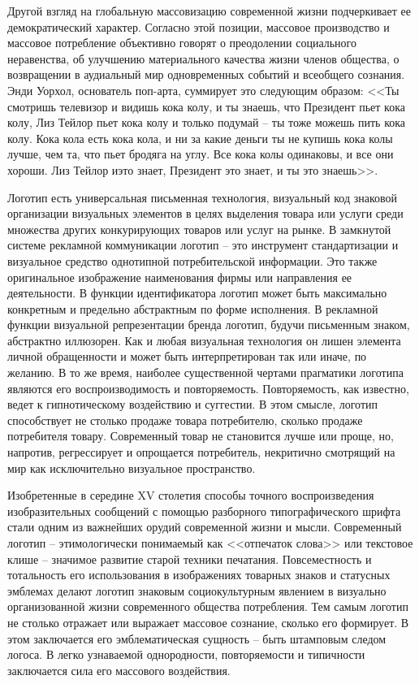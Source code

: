 Другой взгляд на глобальную массовизацию современной жизни подчеркивает ее демократический
характер. Согласно этой позиции, массовое производство и массовое потребление объективно говорят о
преодолении социального неравенства, об улучшению материального качества жизни членов общества, о
возвращении в аудиальный мир одновременных событий и всеобщего сознания. Энди Уорхол, основатель
поп-арта, суммирует это следующим образом: <<Ты смотришь телевизор и видишь кока колу, и ты знаешь,
что Президент пьет кока колу, Лиз Тейлор пьет кока колу и только подумай -- ты тоже можешь пить кока
колу. Кока кола есть кока кола, и ни за какие деньги ты не купишь кока колы лучше, чем та, что пьет
бродяга на углу. Все кока колы одинаковы, и все они хороши. Лиз Тейлор иэто знает, Президент это
знает, и ты это знаешь>>. \autocite[][]{warhol2002}  %

Логотип есть универсальная письменная технология, визуальный код знаковой организации визуальных
элементов в целях выделения товара или услуги среди множества других конкурирующих товаров или услуг
на рынке. В замкнутой системе рекламной коммуникации логотип -- это инструмент стандартизации и
визуальное средство однотипной потребительской информации. Это также оригинальное изображение
наименования фирмы или направления ее деятельности. В функции идентификатора логотип может быть
максимально конкретным и предельно абстрактным по форме исполнения. В рекламной функции визуальной
репрезентации бренда логотип, будучи письменным знаком, абстрактно иллюзорен. Как и любая визуальная
технология он лишен элемента личной обращенности и может быть интерпретирован так или иначе, по
желанию. В то же время, наиболее существенной чертами прагматики логотипа являются его
воспроизводимость и повторяемость. Повторяемость, как известно, ведет к гипнотическому воздействию и
суггестии. В этом смысле, логотип способствует не столько продаже товара потребителю, сколько
продаже потребителя товару. Современный товар не становится лучше или проще, но, напротив,
регрессирует и опрощается потребитель, некритично смотрящий на мир как исключительно визуальное
пространство.

Изобретенные в середине XV столетия способы точного воспроизведения изобразительных сообщений с
помощью разборного типографического шрифта стали одним из важнейших орудий современной жизни и
мысли. Современный логотип -- этимологически  понимаемый как <<отпечаток слова>>  или текстовое
клише -- значимое развитие старой техники печатания. Повсеместность и тотальность его использования
в изображениях товарных знаков и статусных эмблемах  делают логотип знаковым социокультурным
явлением в визуально организованной жизни современного общества потребления. Тем самым логотип не
столько отражает или выражает массовое сознание, сколько его формирует.  В этом заключается его
эмблематическая сущность -- быть штамповым следом логоса. В легко узнаваемой однородности,
повторяемости и типичности заключается сила его массового воздействия.


